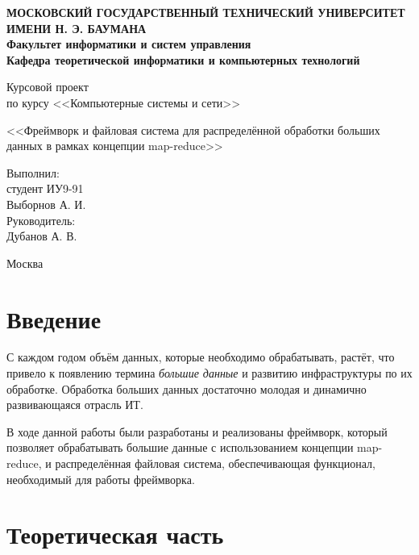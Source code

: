 \documentclass[12pt,a4paper,oneside]{extarticle}
\begin{document}
\pgfplotsset{compat=1.8}

\thispagestyle{empty}
\newpage
{
\centering


\textbf{
МОСКОВСКИЙ ГОСУДАРСТВЕННЫЙ ТЕХНИЧЕСКИЙ УНИВЕРСИТЕТ ИМЕНИ Н. Э. БАУМАНА \\
Факультет информатики и систем управления \\
Кафедра теоретической информатики и компьютерных технологий}
\bigskip
\bigskip
\bigskip
\bigskip
\bigskip
\bigskip
\bigskip

\vfill


Курсовой проект \\
по курсу <<Компьютерные системы и сети>>

\bigskip

{\large <<Фреймворк и файловая система для распределённой обработки больших данных в рамках концепции map-reduce>>}
\bigskip

\vfill



\hfill\parbox{4cm} {
Выполнил:\\
студент ИУ9-91 \hfill \\
Выборнов А. И.\hfill \medskip\\
Руководитель:\\
Дубанов А. В.\hfill
}


\vspace{\fill}

Москва \number\year
\clearpage
}


\tableofcontents

\clearpage


\section*{Введение}
   С каждом годом объём данных, которые необходимо обрабатывать, растёт, что привело к появлению термина {\it большие данные} и развитию инфраструктуры по их обработке. Обработка больших данных достаточно молодая и динамично развивающаяся отрасль ИТ.

   В ходе данной работы были разработаны и реализованы фреймворк, который позволяет обрабатывать большие данные с использованием концепции map-reduce, и распределённая файловая система, обеспечивающая функционал, необходимый для работы фреймворка.
\clearpage

\section{Теоретическая часть}
\end{document}

